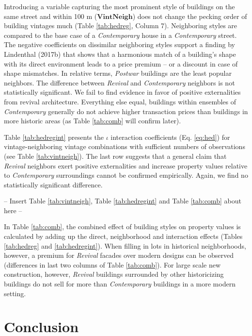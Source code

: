 \documentclass[]{article}
\begin{document}
Introducing a variable capturing the most prominent style of buildings
on the same street and within 100 m (\(\mathbf{VintNeigh}\)) does not
change the pecking order of building vintages much (Table
\ref{tab:hedreg}, Column 7). Neighboring styles are compared to the base
case of a \emph{Contemporary} house in a \emph{Contemporary} street. The
negative coefficients on dissimilar neighboring styles support a finding
by Lindenthal (2017b) that shows that a harmonious match of a building's
shape with its direct environment leads to a price premium -- or a
discount in case of shape mismatches. In relative terms, \emph{Postwar}
buildings are the least popular neighbors. The difference between
\emph{Revival} and \emph{Contemporary} neighbors is not statistically
significant. We fail to find evidence in favor of positive externalities
from revival architecture. Everything else equal, buildings within
ensembles of \emph{Contemporary} generally do not achieve higher
transaction prices than buildings in more historic areas (as Table
\ref{tab:comb} will confirm later).

Table \ref{tab:hedregint} presents the \(\iota\) interaction
coefficients (Eq. \ref{eq:hed}) for vintage-neighboring vintage
combinations with sufficient numbers of observations (see Table
\ref{tab:vintneigh}). The last row suggests that a general claim that
\emph{Revival} neighbors exert positive externalities and increase
property values relative to \emph{Contemporary} surroundings cannot be
confirmed empirically. Again, we find no statistically significant
difference.

\begin{center}
  -- Insert  Table \ref{tab:vintneigh}, Table \ref{tab:hedregint} and Table \ref{tab:comb} about here --
\end{center}

In Table \ref{tab:comb}, the combined effect of building styles on
property values is calculated by adding up the direct, neighborhood and
interaction effects (Tables \ref{tab:hedreg} and \ref{tab:hedregint}).
When filling in lots in historical neighborhoods, however, a premium for
\emph{Revival} facades over modern designs can be observed (differences
in last two columns of Table \ref{tab:comb}). For large scale new
construction, however, \emph{Revival} buildings surrounded by other
historicizing buildings do not sell for more than \emph{Contemporary}
buildings in a more modern setting.

\hypertarget{conclusion}{%
\section{Conclusion}\label{conclusion}}
\end{document}
